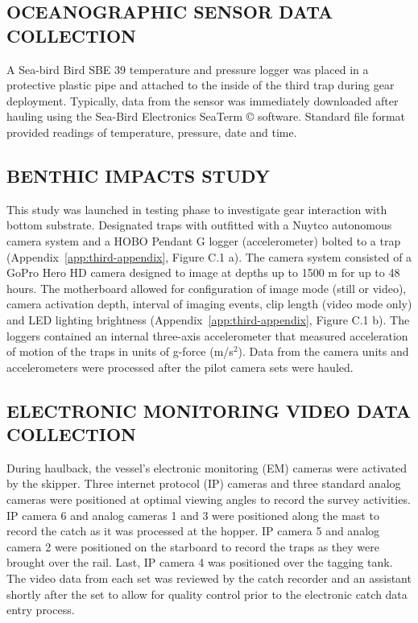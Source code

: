 \documentclass[12pt]{article}\usepackage[]{graphicx}\usepackage[]{color}
\begin{document}
\hypertarget{oceanographic-sensor-data-collection}{%
\subsection{OCEANOGRAPHIC SENSOR DATA COLLECTION}\label{oceanographic-sensor-data-collection}}

A Sea-bird Bird SBE 39 temperature and pressure logger was placed in a protective plastic pipe and attached to the inside of the third trap during gear deployment. Typically, data from the sensor was immediately downloaded after hauling using the Sea-Bird Electronics SeaTerm © software. Standard file format provided readings of temperature, pressure, date and time.

\hypertarget{benthic-impacts-study-1}{%
\subsection{BENTHIC IMPACTS STUDY}\label{benthic-impacts-study-1}}

This study was launched in testing phase to investigate gear interaction with bottom substrate. Designated traps with outfitted with a Nuytco autonomous camera system and a HOBO Pendant G logger (accelerometer) bolted to a trap (Appendix~\ref{app:third-appendix}, Figure C.1 a). The camera system consisted of a GoPro Hero HD camera designed to image at depths up to 1500 m for up to 48 hours. The motherboard allowed for configuration of image mode (still or video), camera activation depth, interval of imaging events, clip length (video mode only) and LED lighting brightness (Appendix~\ref{app:third-appendix}, Figure C.1 b). The loggers contained an internal three-axis accelerometer that measured acceleration of motion of the traps in units of g-force (m/s\(^2\)). Data from the camera units and accelerometers were processed after the pilot camera sets were hauled.

\hypertarget{electronic-monitoring-video-data-collection}{%
\subsection{ELECTRONIC MONITORING VIDEO DATA COLLECTION}\label{electronic-monitoring-video-data-collection}}

During haulback, the vessel's electronic monitoring (EM) cameras were activated by the skipper. Three internet protocol (IP) cameras and three standard analog cameras were positioned at optimal viewing angles to record the survey activities. IP camera 6 and analog cameras 1 and 3 were positioned along the mast to record the catch as it was processed at the hopper. IP camera 5 and analog camera 2 were positioned on the starboard to record the traps as they were brought over the rail. Last, IP camera 4 was positioned over the tagging tank. The video data from each set was reviewed by the catch recorder and an assistant shortly after the set to allow for quality control prior to the electronic catch data entry process.
\end{document}
